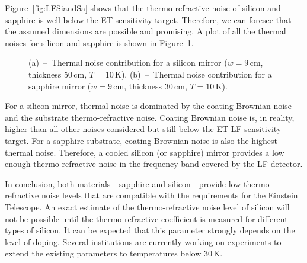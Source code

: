 Figure~\ref{fig:LFSiandSa} shows that the thermo-refractive noise of silicon and sapphire is well below the ET sensitivity target. Therefore, we can foresee that the assumed dimensions are possible and promising. A plot of all the thermal noises for silicon and sapphire is shown in Figure~\ref{fig:SiandSa}. 

\begin{figure}[!h]
\begin{center}
\caption{(a)~--~Thermal noise contribution for a silicon mirror ($w=9$\,cm, thickness 50\,cm, $T=10$\,K). (b)~--~Thermal noise contribution for a sapphire mirror ($w=9$\,cm, thickness 30\,cm, $T=10$\,K).}
\label{fig:SiandSa}
\end{center}
\end{figure}

For a silicon mirror, thermal noise is dominated by the coating Brownian noise and the substrate thermo-refractive noise. Coating Brownian noise is, in reality, higher than all other noises considered but still below the ET-LF sensitivity target. For a sapphire substrate, coating Brownian noise is also the highest thermal noise. Therefore, a cooled silicon (or sapphire) mirror provides a low enough thermo-refractive noise in the frequency band covered by the LF detector. 

In conclusion, both materials---sapphire and silicon---provide low thermo-refractive noise levels that are compatible with the requirements for the Einstein Telescope. An exact estimate of the thermo-refractive noise level of silicon will not be possible until the thermo-refractive coefficient is measured for different types of silicon. It can be expected that this parameter strongly depends on the level of doping. Several institutions are currently working on experiments to extend the existing parameters to temperatures below 30\,K.


